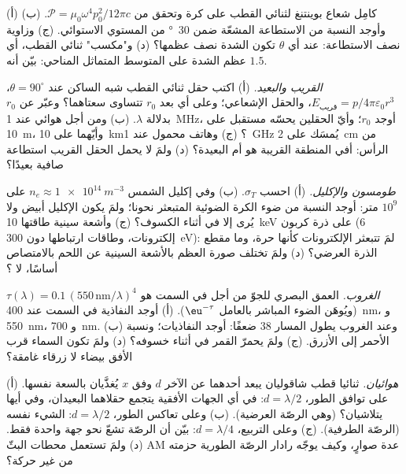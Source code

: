 \begin{exercise}[$\star\star$]\label{exo:b2:dipole-radiation:5}
(أ) كامِل شعاع بوينتنغ لثنائي القطب على كرة
وتحقق من $\mathcal P = \mu_0\omega^4p_0^2/12\pi c$. (ب) وأوجد النسبة من الاستطاعة
المشعّة ضمن \qty{30}{\degree} من المستوي الاستوائي. (ج) وزاوية نصف
الاستطاعة: عند أي $\theta$ تكون الشدة نصف عظمها؟ (د) و"مكسب"
ثنائي القطب، أي عظم الشدة على المتوسط المتماثل المناحي:
بيّن أنه $1.5$.
\end{exercise}

\begin{exercise}[$\star\star$]\label{exo:b2:dipole-radiation:6}
\emph{القريب والبعيد.} (أ) اكتب حقل ثنائي القطب شبه الساكن عند
$\theta = 90^\circ$، $E_{\text{قريب}} = p/4\pi\varepsilon_0r^3$، والحقل الإشعاعي؛ وعلى
أي بعد $r_0$ تتساوى سعتاهما؟ وعبّر عن $r_0$ بدلالة
$\lambda$. (ب) ومن أجل هوائي عند \qty{1}{MHz}، أوجد $r_0$؛ وأيّ الحقلين يحسّه مستقبل
على \qty{10}{m}، وأيّهما على \qty{10}{km}؟ (ج) وهاتف محمول عند \qty{1}{GHz} يُمسَك
على \qty{2}{cm} من الرأس: أفي المنطقة القريبة هو أم البعيدة؟ (د) ولمَ لا يحمل الحقل
القريب استطاعة صافية بعيدًا؟
\end{exercise}

\begin{exercise}[$\star\star$]\label{exo:b2:dipole-radiation:7}
\emph{طومسون والإكليل.} (أ) احسب $\sigma_T$. (ب) وفي إكليل الشمس
$n_e \approx \qty{1e14}{m^{-3}}$ على $10^9$ متر: أوجد النسبة من ضوء الكرة الضوئية
المتبعثر نحونا؛ ولمَ يكون الإكليل أبيض ولا يُرى إلا
في أثناء الكسوف؟ (ج) وأشعة سينية طاقتها \qty{10}{keV} على ذرة كربون ($6$
إلكترونات، وطاقات ارتباطها دون \qty{300}{eV}): لمَ تتبعثر الإلكترونات
كأنها حرة، وما مقطع الذرة العرضي؟ (د) ولمَ
تختلف صورة العظم بالأشعة السينية عن اللحم بالامتصاص أساسًا،
لا ؟
\end{exercise}

\begin{exercise}[$\star\star$]\label{exo:b2:dipole-radiation:8}
\emph{الغروب.} العمق البصري للجوّ من أجل  في السمت هو $\tau(\lambda) = 0.1\,(550\,\text{nm}/\lambda)^4$ (ويُوهَن
الضوء المباشر بالعامل $\eu^{-\tau}$). (أ) أوجد النفاذية في
السمت عند \qty{400}{nm}، و \qty{550}{nm}، و \qty{700}{nm}. (ب) وعند الغروب يطول المسار
$38$ ضعفًا: أوجد النفاذيات؛ ونسبة الأحمر إلى الأزرق. (ج) ولمَ
يحمرّ القمر في أثناء خسوفه؟ (د) ولمَ تكون السماء قرب
الأفق بيضاء لا زرقاء غامقة؟
\end{exercise}

\begin{exercise}[$\star\star$]\label{exo:b2:dipole-radiation:9}
\emph{هوائيان.} ثنائيا قطب شاقوليان يبعد أحدهما عن الآخر $d$ وفق
$x$ يُغذَّيان بالسعة نفسها. (أ) على توافق الطور، $d = \lambda/2$: في أي
الجهات الأفقية يتجمع حقلاهما البعيدان، وفي أيها يتلاشيان؟
(وهي الرصّة العرضية). (ب) وعلى تعاكس الطور، $d = \lambda/2$: الشيء نفسه (الرصّة الطرفية).
(ج) وعلى التربيع، $d = \lambda/4$: بيّن أن الرصّة تشعّ نحو جهة
واحدة فقط. (د) ولمَ تستعمل محطات البثّ AM عدة صوارٍ، وكيف
يوجّه رادار الرصّة الطورية حزمته من غير حركة؟
\end{exercise}

